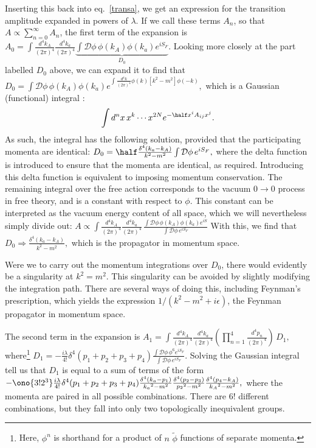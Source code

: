 Inserting this back into eq.~\eqref{transa}, we get an expression for the transition amplitude expanded in powers of $\lambda$. If we call these terms $A_n$, so that $A\propto\sum_{n=0}^\infty A_n$, the first term of the expansion is
\(A_0=\int\frac{d^4k_A}{(2\pi)^4}\frac{d^4k_a}{(2\pi)^4}\underbrace{\int\mathcal D\phi\,\phi(k_A)\phi(k_a)e^{iS_F}}_{D_0}.\)
Looking more closely at the part labelled $D_0$ above, we can expand it to find that
\(D_0=\int\mathcal D\phi\,\phi(k_A)\phi(k_a)e^{\int\frac{d^4k}{(2\pi)^4}\phi(k)[k^2-m^2]\phi(-k)},\)
which is a Gaussian (functional) integral \cite{armbjorn}:
\[\int d^nx\,x^k\cdots x^{2N}e^{-\half x^iA_{ij}x^j}.\label{gausint}\]
As such, the integral has the following solution, provided that the participating momenta are identical:
\(D_0=\half\frac{\delta^4(k_a-k_A)}{k^2-m^2}\int\mathcal D\phi\,e^{iS_F},\)
where the delta function is introduced to ensure that the momenta are identical, as required. Introducing this delta function is equivalent to imposing momentum conservation. The remaining integral over the free action corresponds to the vacuum $0\rightarrow0$ process in free theory, and is a constant with respect to $\phi$. This constant can be interpreted as the vacuum energy content of all space, which we will nevertheless simply divide out:
\(A\propto\int\frac{d^4k_A}{(2\pi)^4}\frac{d^4k_a}{(2\pi)^4}\,\frac{\int\mathcal D\phi\,\phi(k_A)\phi(k_a)e^{iS}}{\int\mathcal D\phi\,e^{iS_F}}\)
With this, we find that 
\(D_0\Rightarrow\frac{\delta^4(k_a-k_A)}{k^2-m^2},\)
which is the propagator in momentum space.

Were we to carry out the momentum integrations over $D_0$, there would evidently be a singularity at $k^2=m^2$. This singularity can be avoided by slightly modifying the integration path. There are several ways of doing this, including Feynman's prescription, which yields the expression $1/(k^2-m^2+i\epsilon)$, the Feynman propagator in momentum space. 

The second term in the expansion is
\(A_1=\int\frac{d^4k_A}{(2\pi)^4}\frac{d^4k_a}{(2\pi)^4}\left(\prod_{n=1}^4\frac{d^4p_n}{(2\pi)^4}\right)\,D_1,\)
where\footnote{Here, $\phi^n$ is shorthand for a product of $n$ $\tilde\phi$ functions of separate momenta.}
\(D_1=-\frac{i\lambda}{4!}\delta^4(p_1+p_2+p_3+p_4)\frac{\int\mathcal D\phi\,\phi^6e^{iS_F}}{\int\mathcal D\phi\,e^{iS_F}}.\) 
Solving the Gaussian integral tell us that $D_1$ is equal to a sum of terms of the form 
\(-\ono{3!2^3}\frac{i\lambda}{4!}\delta^4(p_1+p_2+p_3+p_4)\frac{\delta^4(k_a-p_1)}{{k_a}^2-m^2}\frac{\delta^4(p_2-p_3)}{{p_2}^2-m^2}\frac{\delta^4(p_4-k_A)}{{k_A}^2-m^2},\label{1t1f}\)
where the momenta are paired in all possible combinations. There are $6!$ different combinations, but they fall into only two topologically inequivalent groups.

